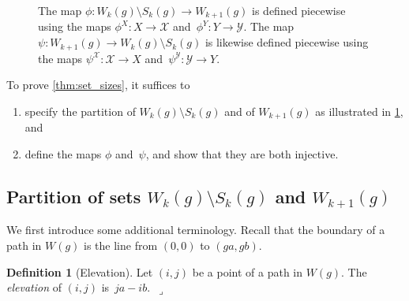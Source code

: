 \documentclass[11pt]{article}
\newcommand{\lrcornerqed}[0]{}
\renewcommand{\lrcornerqed}[0]{\hfill $\lrcorner$} %
\theoremstyle{definition} %
\newtheorem{definition}[thm]{Definition}
\numberwithin{equation}{section}
\begin{document}
\begin{figure}[ht]
    \caption{%
        The map $\phi    \colon W_k(g) \setminus S_k(g) \to W_{k+1}(g)$ is defined piecewise using the maps $\phi^X: X \to \mathcal X$ and~$\phi^Y: Y \to \mathcal Y$. 
        The map $\psi    \colon W_{k+1}(g) \to W_k(g) \setminus S_k(g)$ is likewise defined piecewise using the maps $\psi^\mathcal X: \mathcal X \to X$ and~$\psi^\mathcal Y: \mathcal Y \to Y$.}
    \label{fig:phi_construction_new}
\end{figure}


To prove \cref{thm:set_sizes}, it suffices to 
\begin{enumerate}
    \item
        specify the partition of $W_k(g)\setminus S_k(g)$ and of $W_{k+1}(g)$ as illustrated in \cref{fig:phi_construction_new}, and 
    \item
        define the maps $\phi$ and~$\psi$, and show that they are both injective.
\end{enumerate}




\subsection{Partition of sets $W_k(g)\setminus S_k(g)$ and $W_{k+1}(g)$}
\label{subsec:partition}

We first introduce some additional terminology.  Recall that the boundary of a path in $W(g)$ is the line from $(0,0)$ to $(ga, gb)$.


\begin{definition}[Elevation]
\label{def:elev}
Let $(i,j)$ be a point of a path in $W(g)$.  The \textit{elevation} of $(i,j)$ is~${ja - ib}$.~\lrcornerqed
\end{definition}
\end{document}
